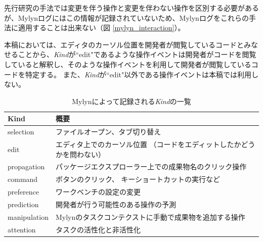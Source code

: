 \documentclass[a4paper]{jsbook}
\begin{document}
先行研究\cite{6233415,KatoJapanese:2011,ss2012-76,ss2013-84,Yamamori:2016}の手法では変更を伴う操作と変更を伴わない操作を区別する必要があるが、Mylynログにはこの情報が記録されていないため、Mylynログをこれらの手法に適用することは出来ない（図 \ref{mylyn_interaction}）。

本稿においては、エディタのカーソル位置を開発者が閲覧しているコードとみなせることから、{\it Kind}が``edit"であるような操作イベントは開発者がコードを閲覧していると解釈し、そのような操作イベントを利用して開発者が閲覧しているコードを特定する。
また、{\it Kind}が``edit"以外である操作イベントは本稿では利用しない。

\begin{table}[tb]
  \centering
  \caption{Mylynによって記録される{\it Kind}の一覧}
  \label{kind_table}
\begin{tabular}{ll}
  \hline
  Kind & 概要\\
  \hline
  selection & ファイルオープン、タブ切り替え\\
  edit & エディタ上でのカーソル位置 （コードをエディットしたかどうかを問わない）\\
  propagation & パッケージエクスプローラー上での成果物名のクリック操作\\
  command & ボタンのクリック、 キーショートカットの実行など\\
  preference & ワークベンチの設定の変更\\
  prediction & 開発者が行う可能性のある操作の予測\cite{Kersten:2006}\\
  manipulation & Mylynのタスクコンテクストに手動で成果物を追加する操作\\
  attention & タスクの活性化と非活性化\\
  \hline
\end{tabular}
\end{table}
\end{document}
